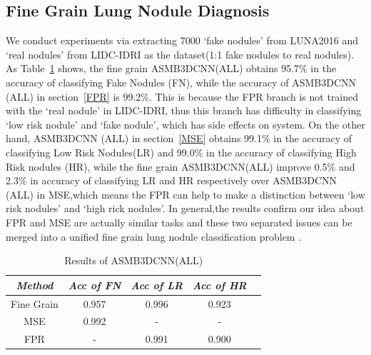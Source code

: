 \documentclass[runningheads]{llncs}
\begin{document}
\subsection{Fine Grain Lung Nodule Diagnosis}
We conduct experiments via extracting 7000 `fake nodules' from LUNA2016 and `real nodules' from LIDC-IDRI as the dataset(1:1 fake nodules to real nodules).
As Table~\ref{tab6} shows, the fine grain ASMB3DCNN(ALL) obtains 95.7\% in the accuracy of classifying Fake Nodules (FN), while the accuracy of ASMB3DCNN (ALL) in section~\ref{FPR} is 99.2\%. This is because the FPR branch is not trained with the `real nodule' in LIDC-IDRI, thus this branch has difficulty in classifying `low risk nodule' and `fake nodule', which has side effects on system.
On the other hand, ASMB3DCNN (ALL) in section~\ref{MSE} obtains 99.1\% in the accuracy of classifying Low Risk Nodules(LR) and 99.0\% in the accuracy of classifying High Risk nodules (HR), while the fine grain ASMB3DCNN(ALL) improve 0.5\% and 2.3\% in accuracy of classifying LR and HR respectively over ASMB3DCNN (ALL) in MSE,which means the FPR can help to make a distinction between `low risk nodules' and `high rick nodules'.
In general,the results confirm our idea about FPR and MSE are actually similar tasks and these two separated issues can be merged into a unified fine grain lung nodule classification problem .

\begin{table}[htb]
\vspace{-0.5cm}
\caption{Results of ASMB3DCNN(ALL)}
\vspace{-0.5cm}
\begin{center}
\begin{tabular}{|c|c|c|c|c|}
\hline
\textbf{\textit{Method}}& \textbf{\textit{Acc of FN}}& \textbf{\textit{Acc of LR}}& \textbf{\textit{Acc of HR}}  \\
\hline
Fine Grain & 0.957 & 0.996 & 0.923\\
MSE  & 0.992 & - & -\\
FPR & - & 0.991 &0.900 \\
\hline
\end{tabular}
\vspace{-0.5cm}
\label{tab6}
\end{center}
\vspace{-0.5cm}
\end{table}
\end{document}
